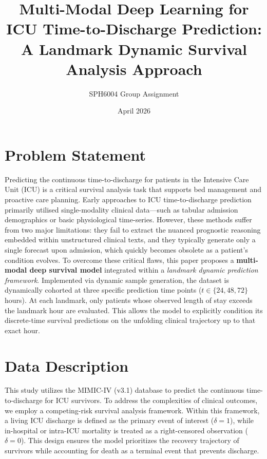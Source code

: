 \documentclass[10pt, a4paper]{article}
\title{\textbf{Multi-Modal Deep Learning for ICU Time-to-Discharge Prediction:\\A Landmark Dynamic Survival Analysis Approach}}
\author{SPH6004 Group Assignment}
\date{April 2026}
\begin{document}
\maketitle


\section{Problem Statement}
\label{sec:problem}

Predicting the continuous time-to-discharge for patients in the Intensive Care Unit (ICU) is a critical survival analysis task that supports bed management and proactive care planning. Early approaches to ICU time-to-discharge prediction primarily utilised single-modality clinical data---such as tabular admission demographics or basic physiological time-series. However, these methods suffer from two major limitations: they fail to extract the nuanced prognostic reasoning embedded within unstructured clinical texts, and they typically generate only a single forecast upon admission, which quickly becomes obsolete as a patient's condition evolves. To overcome these critical flaws, this paper proposes a \textbf{multi-modal deep survival model} integrated within a \textit{landmark dynamic prediction framework}. Implemented via dynamic sample generation, the dataset is dynamically cohorted at three specific prediction time points ($t \in \{24, 48, 72\}$ hours). At each landmark, only patients whose observed length of stay exceeds the landmark hour are evaluated. This allows the model to explicitly condition its discrete-time survival predictions on the unfolding clinical trajectory up to that exact hour.


\section{Data Description}
\label{sec:data}

This study utilizes the MIMIC-IV (v3.1) database to predict the continuous time-to-discharge for ICU survivors. To address the complexities of clinical outcomes, we employ a competing-risk survival analysis framework. Within this framework, a living ICU discharge is defined as the primary event of interest ($\delta = 1$), while in-hospital or intra-ICU mortality is treated as a right-censored observation ($\delta = 0$). This design ensures the model prioritizes the recovery trajectory of survivors while accounting for death as a terminal event that prevents discharge.
\end{document}

